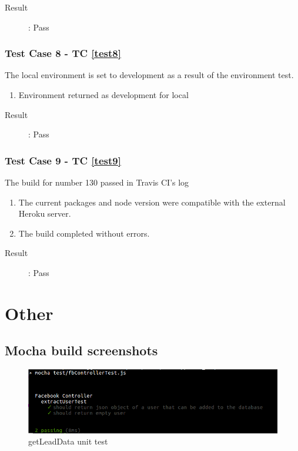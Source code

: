 \documentclass{article}
\begin{document}
\begin{description}
	\item [Result]: Pass 
\end{description}

\subsubsection{Test Case 8 - TC \ref{test8}}
The local environment is set to development as a result of the environment test.
\begin{enumerate}
	\item Environment returned as development for local
\end{enumerate}

\begin{description}
	\item [Result]: Pass 
\end{description}

\subsubsection{Test Case 9 - TC \ref{test9}}
The build for number 130 passed in Travis CI's log
\begin{enumerate}
	\item The current packages and node version were compatible with the external Heroku server.
	\item The build completed without errors.
\end{enumerate}

\begin{description}
	\item [Result]: Pass 
\end{description}

\pagebreak
\section{Other}

	\subsection{Mocha build screenshots}
	
	\begin{figure}[H]
	\includegraphics[width=15cm]{images/FbControllerTest.png}
	\caption{getLeadData unit test}
	\end{figure}
	
\end{document}
